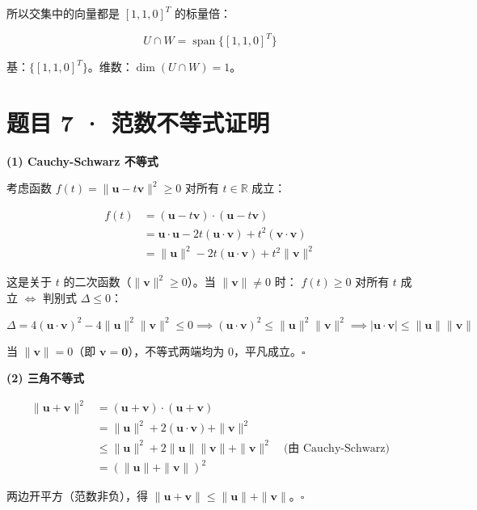 \documentclass[12pt]{ctexart}
\begin{document}
所以交集中的向量都是 $[1, 1, 0]^T$ 的标量倍：

\[
U \cap W = \operatorname{span}\{[1, 1, 0]^T\}
\]

基：$\{[1, 1, 0]^T\}$。维数：$\dim(U \cap W) = 1$。

\section*{题目 7 · 范数不等式证明}

\textbf{(1) Cauchy-Schwarz 不等式}

考虑函数 $f(t) = \|\mathbf{u} - t\mathbf{v}\|^2 \geq 0$ 对所有 $t \in \mathbb{R}$ 成立：

\begin{align*}
f(t) &= (\mathbf{u} - t\mathbf{v}) \cdot (\mathbf{u} - t\mathbf{v}) \\
     &= \mathbf{u}\cdot\mathbf{u} - 2t(\mathbf{u}\cdot\mathbf{v}) + t^2(\mathbf{v}\cdot\mathbf{v}) \\
     &= \|\mathbf{u}\|^2 - 2t(\mathbf{u}\cdot\mathbf{v}) + t^2\|\mathbf{v}\|^2
\end{align*}

这是关于 $t$ 的二次函数（$\|\mathbf{v}\|^2 \geq 0$）。当 $\|\mathbf{v}\| \neq 0$ 时：
$f(t) \geq 0$ 对所有 $t$ 成立 $\iff$ 判别式 $\Delta \leq 0$：

\[
\Delta = 4(\mathbf{u}\cdot\mathbf{v})^2 - 4\|\mathbf{u}\|^2\|\mathbf{v}\|^2 \leq 0
\implies (\mathbf{u}\cdot\mathbf{v})^2 \leq \|\mathbf{u}\|^2\|\mathbf{v}\|^2
\implies |\mathbf{u}\cdot\mathbf{v}| \leq \|\mathbf{u}\|\|\mathbf{v}\|
\]

当 $\|\mathbf{v}\| = 0$（即 $\mathbf{v} = \mathbf{0}$），不等式两端均为 0，平凡成立。$\square$

\textbf{(2) 三角不等式}

\begin{align*}
\|\mathbf{u} + \mathbf{v}\|^2 &= (\mathbf{u} + \mathbf{v}) \cdot (\mathbf{u} + \mathbf{v}) \\
                              &= \|\mathbf{u}\|^2 + 2(\mathbf{u}\cdot\mathbf{v}) + \|\mathbf{v}\|^2 \\
                              &\leq \|\mathbf{u}\|^2 + 2\|\mathbf{u}\|\|\mathbf{v}\| + \|\mathbf{v}\|^2 \quad\text{(由 Cauchy-Schwarz)}\\
                              &= (\|\mathbf{u}\| + \|\mathbf{v}\|)^2
\end{align*}

两边开平方（范数非负），得 $\|\mathbf{u} + \mathbf{v}\| \leq \|\mathbf{u}\| + \|\mathbf{v}\|$。$\square$
\end{document}
